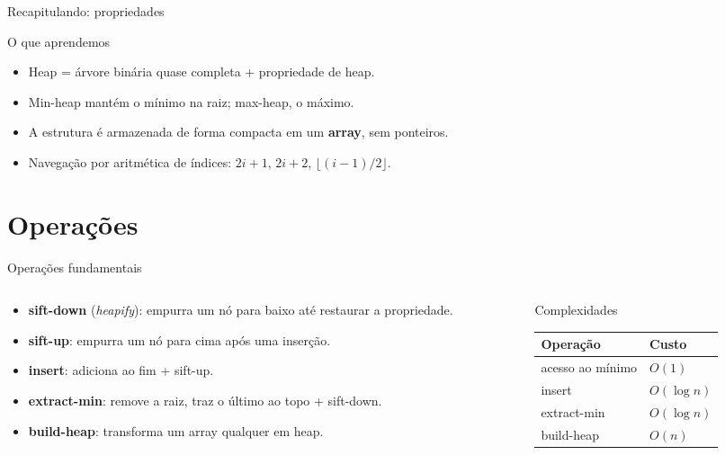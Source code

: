 \documentclass[aspectratio=169]{beamer}
\begin{document}
\begin{frame}{Recapitulando: propriedades}
  \begin{block}{O que aprendemos}
    \begin{itemize}
      \item Heap = árvore binária quase completa + propriedade de heap.
      \item Min-heap mantém o mínimo na raiz; max-heap, o máximo.
      \item A estrutura é armazenada de forma compacta em um \textbf{array},
        sem ponteiros.
      \item Navegação por aritmética de índices: $2i+1$, $2i+2$,
        $\lfloor(i-1)/2\rfloor$.
    \end{itemize}
  \end{block}
\end{frame}

\section{Operações}

\begin{frame}{Operações fundamentais}
  \begin{columns}[T]
    \begin{column}{0.55\textwidth}
      \begin{itemize}
        \item \textbf{sift-down} (\emph{heapify}): empurra um nó para baixo até
          restaurar a propriedade.
        \item \textbf{sift-up}: empurra um nó para cima após uma inserção.
        \item \textbf{insert}: adiciona ao fim + sift-up.
        \item \textbf{extract-min}: remove a raiz, traz o último ao topo +
          sift-down.
        \item \textbf{build-heap}: transforma um array qualquer em heap.
      \end{itemize}
    \end{column}
    \begin{column}{0.45\textwidth}
      \begin{block}{Complexidades}
        \footnotesize
        \begin{tabular}{ll}
          \toprule
          Operação & Custo \\
          \midrule
          acesso ao mínimo & $O(1)$ \\
          insert & $O(\log n)$ \\
          extract-min & $O(\log n)$ \\
          build-heap & $O(n)$ \\
          \bottomrule
        \end{tabular}
      \end{block}
    \end{column}
  \end{columns}
\end{frame}
\end{document}
